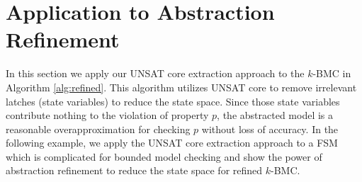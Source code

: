 \section{Application to Abstraction Refinement}
In this section we apply our UNSAT core extraction approach to the 
$k$-BMC in Algorithm \ref{alg:refined}. This algorithm utilizes UNSAT core to 
remove irrelevant latches (state variables) to
reduce the state space. Since those state variables contribute nothing to the violation of 
property $p$, the abstracted model is a reasonable overapproximation for checking 
$p$ without loss of accuracy. In the following example, we apply the UNSAT core extraction 
approach to a FSM which is complicated for bounded model checking and show the power of 
abstraction refinement to reduce the state space for refined $k$-BMC.

